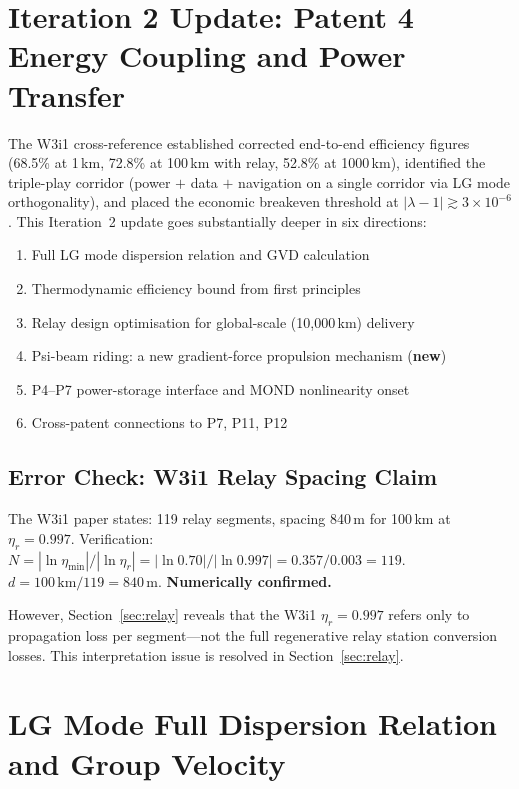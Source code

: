 \documentclass[aps,prd,twocolumn,superscriptaddress]{revtex4-2}
\begin{document}
\section{Iteration 2 Update: Patent 4 Energy Coupling and Power Transfer}
\label{sec:intro}

The W3i1 cross-reference established corrected end-to-end efficiency
figures (68.5\% at 1\,km, 72.8\% at 100\,km with relay, 52.8\% at
1000\,km), identified the triple-play corridor (power $+$ data $+$
navigation on a single corridor via LG mode orthogonality), and
placed the economic breakeven threshold at $|\lambda-1| \gtrsim
3\times10^{-6}$.  This Iteration~2 update goes substantially deeper
in six directions:
\begin{enumerate}
\item Full LG mode dispersion relation and GVD calculation
\item Thermodynamic efficiency bound from first principles
\item Relay design optimisation for global-scale (10,000\,km) delivery
\item Psi-beam riding: a new gradient-force propulsion mechanism (\textbf{new})
\item P4--P7 power-storage interface and MOND nonlinearity onset
\item Cross-patent connections to P7, P11, P12
\end{enumerate}

\subsection{Error Check: W3i1 Relay Spacing Claim}

The W3i1 paper states: 119 relay segments, spacing 840\,m for 100\,km
at $\eta_r = 0.997$.  Verification:
$N = |\ln\eta_\mathrm{min}|/|\ln\eta_r| = |\ln 0.70|/|\ln 0.997|
= 0.357/0.003 = 119$.
$d = 100\,\mathrm{km}/119 = 840\,\mathrm{m}$.  \textbf{Numerically confirmed.}

However, Section~\ref{sec:relay} reveals that the W3i1 $\eta_r = 0.997$
refers only to propagation loss per segment---not the full regenerative
relay station conversion losses.  This interpretation issue is resolved
in Section~\ref{sec:relay}.

\section{LG Mode Full Dispersion Relation and Group Velocity}
\label{sec:dispersion}
\end{document}
